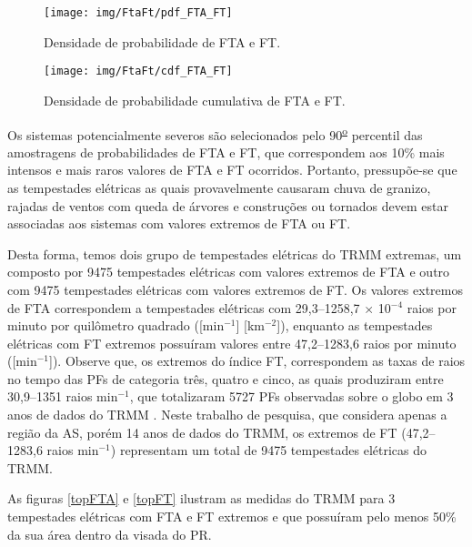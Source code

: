 \begin{figure}[!ht]
  \centering
  \texttt{[image: img/FtaFt/pdf\_FTA\_FT]}      
  \caption{Densidade de probabilidade de FTA e FT.} 
   \label{pdfFTAFT} 
\end{figure}

\begin{figure}[!hb]
  \centering 
  \texttt{[image: img/FtaFt/cdf\_FTA\_FT]} 
  \caption{Densidade de probabilidade cumulativa de FTA e FT.}
  \label{cdfFTAFT}
\end{figure}

Os sistemas potencialmente severos são selecionados pelo 90\textsuperscript{\underline{o}} percentil das amostragens de probabilidades de FTA e FT, que correspondem aos 10\% mais intensos e mais raros valores de FTA e FT ocorridos. Portanto, pressupõe-se que as tempestades elétricas as quais provavelmente causaram chuva de granizo, rajadas de ventos com queda de árvores e construções ou tornados devem estar associadas aos sistemas com valores extremos de FTA ou FT.

Desta forma, temos dois grupo de tempestades elétricas do TRMM extremas, um composto por 9475 tempestades elétricas com valores extremos de FTA e outro com 9475 tempestades elétricas com valores extremos de FT. Os valores extremos de FTA correspondem a tempestades elétricas com {29,3--1258,7 $\times$ 10$^{-4}$} raios por minuto por quilômetro quadrado ([min$^{-1}$] [km$^{-2}$]), enquanto as tempestades elétricas com FT extremos possuíram valores entre {47,2--1283,6} raios por minuto ([min$^{-1}$]). Observe que, os extremos do índice FT, correspondem as taxas de raios no tempo das PFs de categoria três, quatro e cinco, as quais produziram entre 30,9--1351 raios min$^{-1}$, que totalizaram 5727 PFs observadas sobre o globo em 3 anos de dados do TRMM \cite{cecil2005}. Neste trabalho de pesquisa, que considera apenas a região da AS, porém 14 anos de dados do TRMM, os extremos de FT ({47,2--1283,6} raios min$^{-1}$) representam um total de 9475 tempestades elétricas do TRMM.      


As figuras \ref{topFTA} e \ref{topFT} ilustram as medidas do TRMM para 3 tempestades elétricas com FTA e FT extremos e que possuíram pelo menos 50\% da sua área dentro da visada do PR. 



